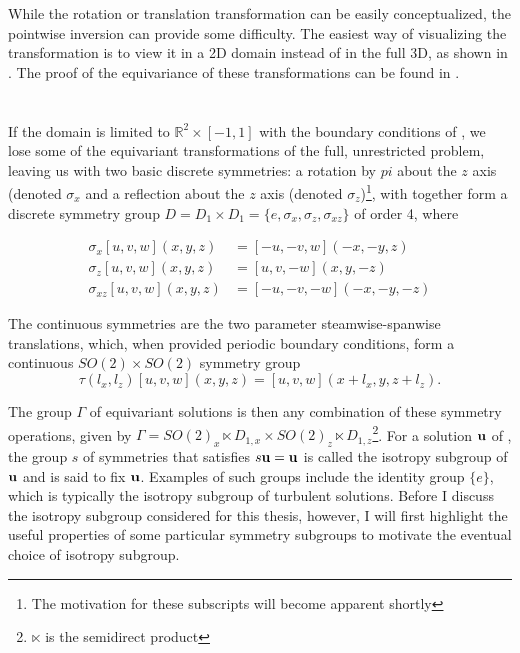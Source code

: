 While the rotation or translation transformation can be easily conceptualized, the pointwise inversion can provide some difficulty. The easiest way of visualizing the transformation is to view it in a 2D domain instead of in the full 3D, as shown in . The proof of the equivariance of these transformations can be found in \cite{a}.



\section{\pCf}

If the domain is limited to $\mathbb{R}^2 \times [-1,1]$ with the boundary conditions of \pCf, we lose some of the equivariant transformations of the full, unrestricted problem, leaving us with two basic discrete symmetries: a rotation by $pi$ about the $z$ axis (denoted $\sigma_x$ and a reflection about the $z$ axis (denoted $\sigma_z$)\footnote{The motivation for these subscripts will become apparent shortly}, with together form a discrete symmetry group $D = D_1 \times D_1 = \{e, \sigma_x,\sigma_z,\sigma_{xz}\}$ of order 4, where

\begin{align}\label{eq:discretesymm}
\sigma_x [u,v,w](x,y,z) &= [-u,-v,w](-x,-y,z)\\
\sigma_z [u,v,w](x,y,z) &= [u,v,-w](x,y,-z)\\
\sigma_{xz} [u,v,w](x,y,z) &= [-u,-v,-w](-x,-y,-z)
\end{align}

The continuous symmetries are the two parameter steamwise-spanwise translations, which, when provided periodic boundary conditions, form a continuous $SO(2)\times SO(2)$ symmetry group 
\begin{equation}\label{eq:contsymm}
\tau(l_x,l_z)[u,v,w](x,y,z) = [u,v,w](x+l_x,y,z+l_z).
\end{equation}

The group $\Gamma$ of equivariant solutions is then any combination of these symmetry operations, given by $\Gamma = SO(2)_x \ltimes D_{1,x} \times SO(2)_z \ltimes D_{1,z}$\footnote{$\ltimes$ is the semidirect product}. For a solution $\mathbf{u}$ of \pCf, the group $s$ of symmetries that satisfies $s\mathbf{u} = \mathbf{u}$ is called the isotropy subgroup of $\mathbf{u}$ and is said to fix $\mathbf{u}$. Examples of such groups include the identity group $\{e\}$, which is typically the isotropy subgroup of turbulent solutions. Before I discuss the isotropy subgroup considered for this thesis, however, I will first highlight the useful properties of some particular symmetry subgroups to motivate the eventual choice of isotropy subgroup. 

